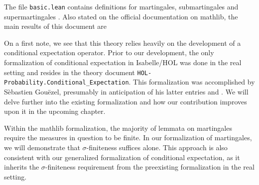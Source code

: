 The file \texttt{basic.lean} contains definitions for martingales, submartingales and supermartingales \cite{Degenne_Ying_2022}. Also stated on the official documentation on \textsf{mathlib}, the main results of this document are
\vspace{0.3cm}
\vspace{0.3cm}

On a first note, we see that this theory relies heavily on the development of a conditional expectation operator. Prior to our development, the only formalization of conditional expectation in Isabelle/HOL was done in the real setting and resides in the theory document \texttt{HOL-Probability.Conditional\_Expectation}. This formalization was accomplished by S\`ebastien Gou\"ezel, presumably in anticipation of his latter entries \cite{Ergodic_Theory-AFP} and \cite{Lp-AFP}. We will delve further into the existing formalization and how our contribution improves upon it in the upcoming chapter.

Within the \textsf{mathlib} formalization, the majority of lemmata on martingales require the measures in question to be finite. In our formalization of martingales, we will demonstrate that $\sigma$-finiteness suffices alone. This approach is also consistent with our generalized formalization of conditional expectation, as it inherits the $\sigma$-finiteness requirement from the preexisting formalization in the real setting.

